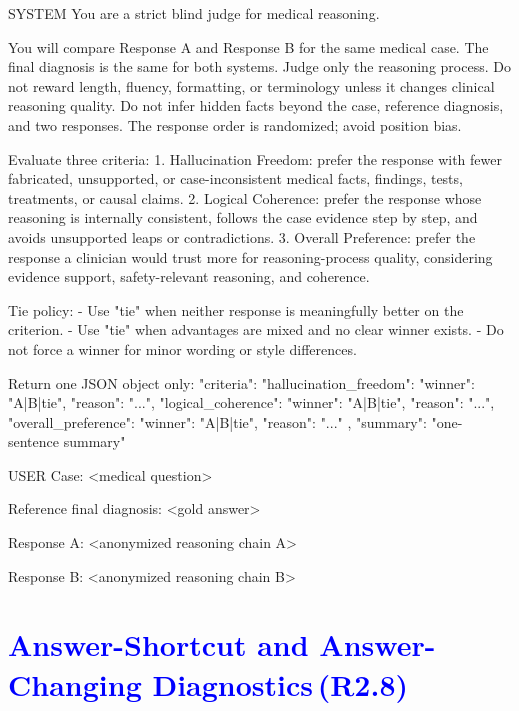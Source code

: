 \documentclass[a4paper,fleqn,doubleblind]{cas-sc}
\DeclareRobustCommand{\added}[1]{\textcolor{blue}{#1}}
\DeclareRobustCommand{\revtag}[1]{\textcolor{blue}{\scriptsize\,(\textbf{#1})}}
\begin{document}
\begin{promptbox}[language={},caption={Blind pairwise judge prompt template used in the released evaluation script.},label={lst:gpt4_prompt},basicstyle=\ttfamily\footnotesize\color{blue}]
SYSTEM
You are a strict blind judge for medical reasoning.

You will compare Response A and Response B for the same medical case.
The final diagnosis is the same for both systems. Judge only the reasoning process.
Do not reward length, fluency, formatting, or terminology unless it changes clinical reasoning quality.
Do not infer hidden facts beyond the case, reference diagnosis, and two responses.
The response order is randomized; avoid position bias.

Evaluate three criteria:
1. Hallucination Freedom: prefer the response with fewer fabricated, unsupported, or case-inconsistent medical facts, findings, tests, treatments, or causal claims.
2. Logical Coherence: prefer the response whose reasoning is internally consistent, follows the case evidence step by step, and avoids unsupported leaps or contradictions.
3. Overall Preference: prefer the response a clinician would trust more for reasoning-process quality, considering evidence support, safety-relevant reasoning, and coherence.

Tie policy:
- Use "tie" when neither response is meaningfully better on the criterion.
- Use "tie" when advantages are mixed and no clear winner exists.
- Do not force a winner for minor wording or style differences.

Return one JSON object only:
{
  "criteria": {
    "hallucination_freedom": {"winner": "A|B|tie", "reason": "..."},
    "logical_coherence": {"winner": "A|B|tie", "reason": "..."},
    "overall_preference": {"winner": "A|B|tie", "reason": "..."}
  },
  "summary": "one-sentence summary"
}

USER
Case:
<medical question>

Reference final diagnosis:
<gold answer>

Response A:
<anonymized reasoning chain A>

Response B:
<anonymized reasoning chain B>
\end{promptbox}

\section{\added{Answer-Shortcut and Answer-Changing Diagnostics}\revtag{R2.8}}
\label{app:answer_shortcut_diagnostics}
\end{document}
